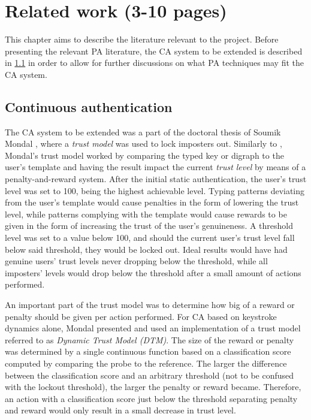 \documentclass[informationsecurity]{gucmasterproject}
\begin{document}
\chapter{Related work (3-10 pages)}
\label{chap:related}
This chapter aims to describe the literature relevant to the project.
Before presenting the relevant PA literature, the CA system to be extended is described in \cref{sec:related-CA} in order to allow for further discussions on what PA techniques may fit the CA system.

\section{Continuous authentication}
\label{sec:related-CA}
The CA system to be extended was a part of the doctoral thesis of Soumik Mondal \cite{mondal}, where a \textit{trust model} was used to lock imposters out.
Similarly to \cite{BOURS201236}, Mondal's trust model worked by comparing the typed key or digraph to the user's template and having the result impact the current \textit{trust level} by means of a penalty-and-reward system.
After the initial static authentication, the user's trust level was set to 100, being the highest achievable level.
Typing patterns deviating from the user's template would cause penalties in the form of lowering the trust level, while patterns complying with the template would cause rewards to be given in the form of increasing the trust of the user's genuineness.
A threshold level was set to a value below 100, and should the current user's trust level fall below said threshold, they would be locked out.
Ideal results would have had genuine users' trust levels never dropping below the threshold, while all imposters' levels would drop below the threshold after a small amount of actions performed.

An important part of the trust model was to determine how big of a reward or penalty should be given per action performed.
For CA based on keystroke dynamics alone, Mondal \cite{mondal} presented and used an implementation of a trust model referred to as \textit{Dynamic Trust Model (DTM)}.
The size of the reward or penalty was determined by a single continuous function based on a classification score computed by comparing the probe to the reference.
The larger the difference between the classification score and an arbitrary threshold (not to be confused with the lockout threshold), the larger the penalty or reward became.
Therefore, an action with a classification score just below the threshold separating penalty and reward would only result in a small decrease in trust level.
\end{document}
